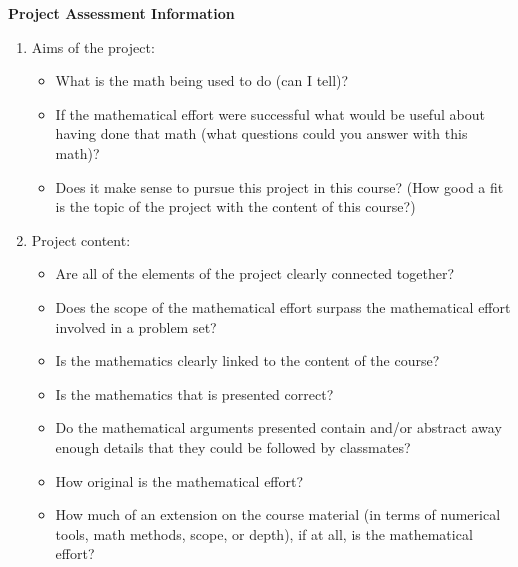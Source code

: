 \documentclass[12pt,letterpaper,noanswers]{exam}
\begin{document}
 \pdfpageheight 11in 
  \pdfpagewidth 8.5in
  
\textbf{Project Assessment Information}


\begin{enumerate}
    \item 
Aims of the project:
\begin{itemize}
    \item What is the math being used to do (can I tell)?
    \item If the mathematical effort were successful what would be useful about having done that math (what questions could you answer with this math)?
    \item Does it make sense to pursue this project in this course?  (How good a fit is the topic of the project with the content of this course?)
\end{itemize}

\item
Project content:
\begin{itemize}
    \item Are all of the elements of the project clearly connected together?
    \item Does the scope of the mathematical effort surpass the mathematical effort involved in a problem set?
    \item Is the mathematics clearly linked to the content of the course?
    \item Is the mathematics that is presented correct?
    \item  Do the mathematical arguments presented contain and/or abstract away enough details that they could be followed by classmates?
    \item How original is the mathematical effort?
    \item How much of an extension on the course material (in terms of numerical tools, math methods, scope, or depth), if at all, is the mathematical effort?
\end{itemize}



\end{enumerate}
\end{document}
